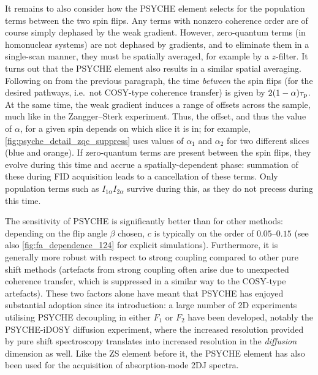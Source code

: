 It remains to also consider how the PSYCHE element selects for the population terms between the two spin flips.
Any terms with nonzero coherence order are of course simply dephased by the weak gradient.
However, zero-quantum terms (in homonuclear systems) are not dephased by gradients, and to eliminate them in a single-scan manner, they must be spatially averaged, for example by a $z$-filter.
It turns out that the PSYCHE element also results in a similar spatial averaging.
Following on from the previous paragraph, the time \textit{between} the spin flips (for the desired pathways, i.e.\ not COSY-type coherence transfer) is given by $2(1 - \alpha)\tau_\mathrm{p}$.
At the same time, the weak gradient induces a range of offsets across the sample, much like in the Zangger--Sterk experiment.
Thus, the offset, and thus the value of $\alpha$, for a given spin depends on which slice it is in; for example, \cref{fig:psyche_detail_zqc_suppress} uses values of $\alpha_1$ and $\alpha_2$ for two different slices (blue and orange).
If zero-quantum terms are present between the spin flips, they evolve during this time and accrue a spatially-dependent phase: summation of these during FID acquisition leads to a cancellation of these terms.
Only population terms such as $I_{1\alpha}I_{2\alpha}$ survive during this, as they do not precess during this time.

The sensitivity of PSYCHE is significantly better than for other methods: depending on the flip angle $\beta$ chosen, $c$ is typically on the order of $0.05$--$0.15$ (see also \cref{fig:fa_dependence_124} for explicit simulations).
Furthermore, it is generally more robust with respect to strong coupling compared to other pure shift methods (artefacts from strong coupling often arise due to unexpected coherence transfer\autocite{Thrippleton2005JMR}, which is suppressed in a similar way to the COSY-type artefacts).
These two factors alone have meant that PSYCHE has enjoyed substantial adoption since its introduction: a large number of 2D experiments utilising PSYCHE decoupling in either $F_1$ or $F_2$ have been developed,\autocite{Foroozandeh2014JACS,Timari2015CEJ,Koos2016ACIE,Sinnaeve2016ACIE,Aguilar2018MRC,Kaltschnee2016JMR,Ilgen2021JMR} notably the PSYCHE-iDOSY diffusion experiment\autocite{Foroozandeh2016ACIE}, where the increased resolution provided by pure shift spectroscopy translates into increased resolution in the \textit{diffusion} dimension as well.
Like the ZS element before it, the PSYCHE element has also been used for the acquisition of absorption-mode 2DJ spectra.\autocite{Foroozandeh2015CC}

